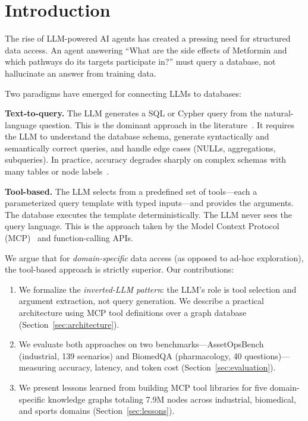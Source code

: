 \documentclass[sigconf, anonymous, review]{acmart}
\begin{document}
\section{Introduction}\label{sec:intro}

The rise of LLM-powered AI agents has created a pressing need for
structured data access.  An agent answering ``What are the side
effects of Metformin and which pathways do its targets participate
in?'' must query a database, not hallucinate an answer from
training data.

Two paradigms have emerged for connecting LLMs to databases:

\smallskip\noindent\textbf{Text-to-query.}
The LLM generates a SQL or Cypher query from the natural-language
question.  This is the dominant approach in the
literature~\cite{rajkumar2022text2sql, gao2024texttosql}.
It requires the LLM to understand the database schema, generate
syntactically and semantically correct queries, and handle edge
cases (NULLs, aggregations, subqueries).  In practice,
accuracy degrades sharply on complex schemas with many tables
or node labels~\cite{li2024dawn}.

\smallskip\noindent\textbf{Tool-based.}
The LLM selects from a predefined set of tools---each a
parameterized query template with typed inputs---and provides
the arguments.  The database executes the template deterministically.
The LLM never sees the query language.  This is the approach
taken by the Model Context Protocol (MCP)~\cite{anthropic2024mcp}
and function-calling APIs.

We argue that for \emph{domain-specific} data access (as opposed
to ad-hoc exploration), the tool-based approach is strictly
superior.  Our contributions:

\begin{enumerate}
\item We formalize the \emph{inverted-LLM pattern}: the LLM's
  role is tool selection and argument extraction, not query
  generation.  We describe a practical architecture using
  MCP tool definitions over a graph database
  (Section~\ref{sec:architecture}).

\item We evaluate both approaches on two benchmarks---AssetOpsBench
  (industrial, 139 scenarios) and BiomedQA (pharmacology,
  40 questions)---measuring accuracy, latency, and token cost
  (Section~\ref{sec:evaluation}).

\item We present lessons learned from building MCP tool libraries
  for five domain-specific knowledge graphs totaling 7.9M nodes
  across industrial, biomedical, and sports domains
  (Section~\ref{sec:lessons}).
\end{enumerate}
\end{document}
